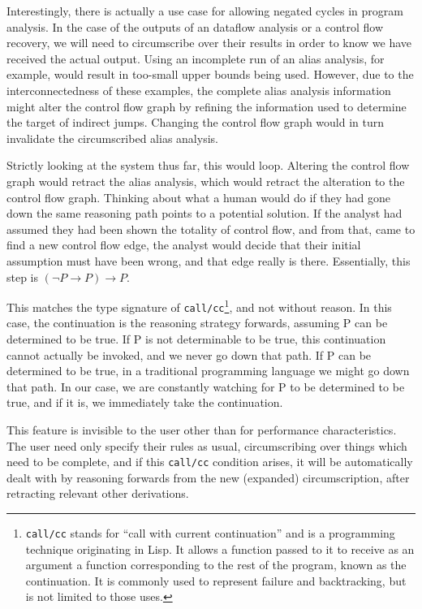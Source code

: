 Interestingly, there is actually a use case for allowing negated cycles in program analysis.
In the case of the outputs of an dataflow analysis or a control flow recovery, we will need to circumscribe over their results in order to know we have received the actual output.
Using an incomplete run of an alias analysis, for example, would result in too-small upper bounds being used.
However, due to the interconnectedness of these examples, the complete alias analysis information might alter the control flow graph by refining the information used to determine the target of indirect jumps.
Changing the control flow graph would in turn invalidate the circumscribed alias analysis.

Strictly looking at the system thus far, this would loop.
Altering the control flow graph would retract the alias analysis, which would retract the alteration to the control flow graph.
Thinking about what a human would do if they had gone down the same reasoning path points to a potential solution.
If the analyst had assumed they had been shown the totality of control flow, and from that, came to find a new control flow edge, the analyst would decide that their initial assumption must have been wrong, and that edge really is there.
Essentially, this step is $(\neg P \rightarrow P) \rightarrow P$.

This matches the type signature of \texttt{call/cc}\footnote{
	\texttt{call/cc} stands for ``call with current continuation'' and is a programming technique originating in Lisp.
	It allows a function passed to it to receive as an argument a function corresponding to the rest of the program, known as the continuation.
	It is commonly used to represent failure and backtracking, but is not limited to those uses.
}, and not without reason.
In this case, the continuation is the reasoning strategy forwards, assuming P can be determined to be true.
If P is not determinable to be true, this continuation cannot actually be invoked, and we never go down that path.
If P can be determined to be true, in a traditional programming language we might go down that path.
In our case, we are constantly watching for P to be determined to be true, and if it is, we immediately take the continuation.

This feature is invisible to the user other than for performance characteristics.
The user need only specify their rules as usual, circumscribing over things which need to be complete, and if this \texttt{call/cc} condition arises, it will be automatically dealt with by reasoning forwards from the new (expanded) circumscription, after retracting relevant other derivations.



